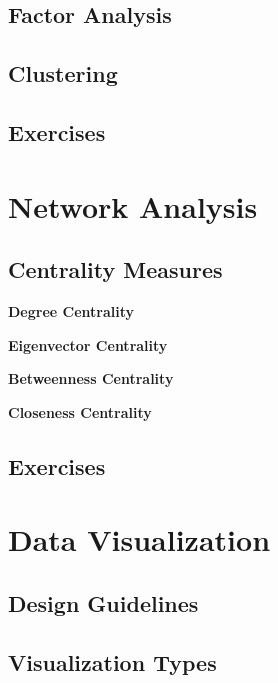 \documentclass[]{book}
\begin{document}
\hypertarget{factor-analysis}{%
\section{Factor Analysis}\label{factor-analysis}}

\hypertarget{clustering}{%
\section{Clustering}\label{clustering}}

\hypertarget{exercises-11}{%
\section{Exercises}\label{exercises-11}}

\hypertarget{net-anal}{%
\chapter{Network Analysis}\label{net-anal}}

\hypertarget{centrality-measures}{%
\section{Centrality Measures}\label{centrality-measures}}

\textbf{Degree Centrality}

\textbf{Eigenvector Centrality}

\textbf{Betweenness Centrality}

\textbf{Closeness Centrality}

\hypertarget{exercises-12}{%
\section{Exercises}\label{exercises-12}}

\hypertarget{data-viz}{%
\chapter{Data Visualization}\label{data-viz}}

\hypertarget{design-guidelines}{%
\section{Design Guidelines}\label{design-guidelines}}

\hypertarget{visualization-types}{%
\section{Visualization Types}\label{visualization-types}}
\end{document}
